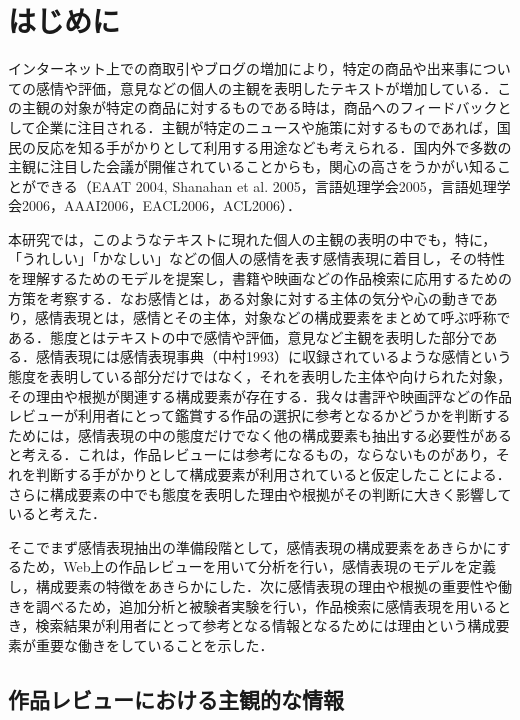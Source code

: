 \documentclass[japanese]{jnlp_1.3a}
\begin{document}
\maketitle




\section{はじめに}

インターネット上での商取引やブログの増加により，特定の商品や出来事についての感情や評価，意見などの個人の主観を表明したテキストが増加している．この主観の対象が特定の商品に対するものである時は，商品へのフィードバックとして企業に注目される．主観が特定のニュースや施策に対するものであれば，国民の反応を知る手がかりとして利用する用途なども考えられる．国内外で多数の主観に注目した会議が開催されていることからも，関心の高さをうかがい知ることができる（EAAT 2004, Shanahan et al. 2005，言語処理学会2005，言語処理学会2006，AAAI2006，EACL2006，ACL2006）． 

本研究では，このようなテキストに現れた個人の主観の表明の中でも，特に，「うれしい」「かなしい」などの個人の感情を表す感情表現に着目し，その特性を理解するためのモデルを提案し，書籍や映画などの作品検索に応用するための方策を考察する．なお感情とは，ある対象に対する主体の気分や心の動きであり，感情表現とは，感情とその主体，対象などの構成要素をまとめて呼ぶ呼称である．態度とはテキストの中で感情や評価，意見など主観を表明した部分である．感情表現には感情表現事典（中村1993）に収録されているような感情という態度を表明している部分だけではなく，それを表明した主体や向けられた対象，その理由や根拠が関連する構成要素が存在する．我々は書評や映画評などの作品レビューが利用者にとって鑑賞する作品の選択に参考となるかどうかを判断するためには，感情表現の中の態度だけでなく他の構成要素も抽出する必要性があると考える．これは，作品レビューには参考になるもの，ならないものがあり，それを判断する手がかりとして構成要素が利用されていると仮定したことによる．さらに構成要素の中でも態度を表明した理由や根拠がその判断に大きく影響していると考えた．

そこでまず感情表現抽出の準備段階として，感情表現の構成要素をあきらかにするため，Web上の作品レビューを用いて分析を行い，感情表現のモデルを定義し，構成要素の特徴をあきらかにした．次に感情表現の理由や根拠の重要性や働きを調べるため，追加分析と被験者実験を行い，作品検索に感情表現を用いるとき，検索結果が利用者にとって参考となる情報となるためには理由という構成要素が重要な働きをしていることを示した．

\subsection{作品レビューにおける主観的な情報}
\end{document}
